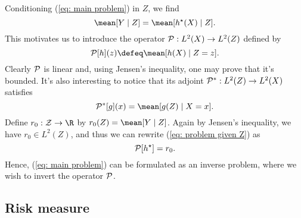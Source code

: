 Conditioning (\ref{eq: main problem}) in $ Z $, we find
\begin{equation}
    \label{eq: problem given Z}
    \mean [ Y \mid Z ] = \mean [ \hstar ( X ) \mid Z ]
.\end{equation}
This motivates us to introduce the operator $ \mathcal{P} : L^{ 2 } ( X ) \to L^{ 2 } ( Z ) $ defined by
\begin{equation*}
    \meanop [ h ] ( z ) \defeq \mean [ h ( X ) \mid Z = z ]
.\end{equation*}
Clearly $ \mathcal{P} $ is linear and, using Jensen's inequality, one may prove that it's bounded.
It's also interesting to notice that its adjoint $ \mathcal{P}^{ * } : L^{ 2 } ( Z ) \to L^{ 2 } ( X ) $ satisfies
\begin{equation}
    \label{eq: T adjoint}
    \meanop^{ * } [ g ] ( x ) = \mean [ g ( Z ) \mid X = x ].
\end{equation}
Define $ r_{ 0 } : \mathcal{Z} \to \R $ by $ r_{ 0 } ( Z ) = \mean [ Y \mid Z ] $.
Again by Jensen's inequality, we have $ r_{ 0 } \in L^{ 2 } ( Z ) $, and thus we can rewrite (\ref{eq: problem given Z}) as
\begin{equation}
    \label{eq: problem with T}
    \mathcal{P} [ h^{ \star } ] = r_{ 0 }
.\end{equation}
Hence, (\ref{eq: main problem}) can be formulated as an inverse problem, where we wish to invert the operator $ \mathcal{P} $.

\subsection{Risk measure}

